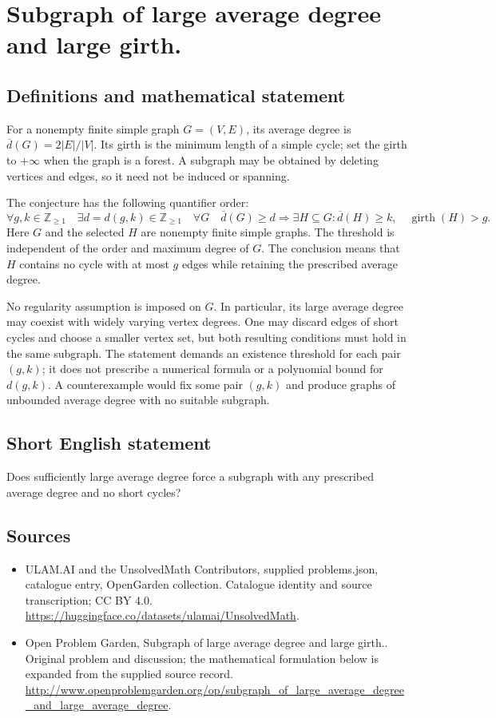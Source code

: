 \documentclass[11pt,a4paper]{article}
\begin{document}
\section*{Subgraph of large average degree and large girth.}\label{statement}

\subsection{Definitions and mathematical statement}
For a nonempty finite simple graph $G=(V,E)$, its average degree
is $\overline d(G)=2|E|/|V|$. Its girth is the minimum length of
a simple cycle; set the girth to $+\infty$ when the graph is a
forest. A subgraph may be obtained by deleting vertices and
edges, so it need not be induced or spanning.

The conjecture has the following quantifier order:
\[
 \forall g,k\in\mathbb Z_{\geq1}\quad
 \exists d=d(g,k)\in\mathbb Z_{\geq1}\quad
 \forall G\quad
 \overline d(G)\geq d\Longrightarrow
 \exists H\subseteq G:
 \overline d(H)\geq k,\quad\operatorname{girth}(H)>g.
\]
Here $G$ and the selected $H$ are nonempty finite simple graphs.
The threshold is independent of the order and maximum degree
of $G$. The conclusion means that $H$ contains no cycle with at
most $g$ edges while retaining the prescribed average degree.

No regularity assumption is imposed on $G$. In particular, its
large average degree may coexist with widely varying vertex
degrees. One may discard edges of short cycles and choose a
smaller vertex set, but both resulting conditions must hold in
the same subgraph. The statement demands an existence threshold
for each pair $(g,k)$; it does not prescribe a numerical formula
or a polynomial bound for $d(g,k)$. A counterexample would fix
some pair $(g,k)$ and produce graphs of unbounded average degree
with no suitable subgraph.
\subsection{Short English statement}
Does sufficiently large average degree force a subgraph with any prescribed average degree and no short cycles?
\subsection{Sources}
\begin{itemize}
\item[S1] ULAM.AI and the UnsolvedMath Contributors, supplied problems.json, catalogue entry, OpenGarden collection. Catalogue identity and source transcription; CC BY 4.0.
\url{https://huggingface.co/datasets/ulamai/UnsolvedMath}.
\item[S2] Open Problem Garden, Subgraph of large average degree and large girth.. Original problem and discussion; the mathematical formulation below is expanded from the supplied source record.
\url{http://www.openproblemgarden.org/op/subgraph_of_large_average_degree_and_large_average_degree}.
\end{itemize}
\end{document}
